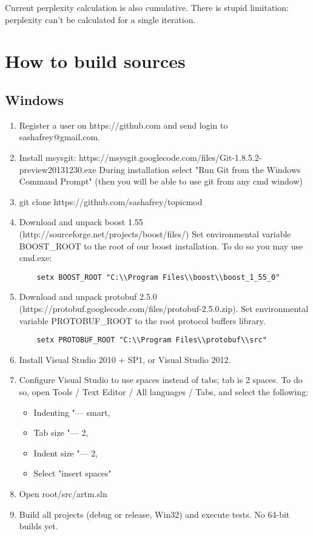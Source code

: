 \documentclass[11pt,a4paper,twoside]{report}
\begin{document}
Current perplexity calculation is also cumulative. 
There is stupid limitation: perplexity can't be calculated for a single iteration.

\section{How to build sources}

\subsection{Windows}

\begin{enumerate}
\item Register a user on https://github.com and send login to sashafrey@gmail.com.
\item Install msysgit:
	https://msysgit.googlecode.com/files/Git-1.8.5.2-preview20131230.exe
   During installation select "Run Git from the Windows Command Prompt"
   (then you will be able to use git from any cmd window)
\item git clone https://github.com/sashafrey/topicmod
\item Download and unpack boost 1.55 (http://sourceforge.net/projects/boost/files/)
   Set environmental variable BOOST\_ROOT to the root of our boost installation. To do so you may use cmd.exe:
 \begin{verbatim}
 	setx BOOST_ROOT "C:\\Program Files\\boost\\boost_1_55_0"
 \end{verbatim}
\item Download and unpack protobuf 2.5.0 (https://protobuf.googlecode.com/files/protobuf-2.5.0.zip).
   Set environmental variable PROTOBUF\_ROOT to the root protocol buffers library.
  \begin{verbatim}
	setx PROTOBUF_ROOT "C:\\Program Files\\protobuf\\src"
  \end{verbatim}
\item Install Visual Studio 2010 + SP1, or Visual Studio 2012.
\item Configure Visual Studio to use spaces instead of tabs; tab is 2 spaces.
    To do so, open Tools / Text Editor / All languages / Tabs, and select the following:
    \begin{itemize}
        \item Indenting "--- smart,
        \item Tab size "--- 2,
        \item Indent size "--- 2,
        \item Select "insert spaces"
    \end{itemize}
\item Open root/src/artm.sln
\item Build all projects (debug or release, Win32) and execute tests. No 64-bit builds yet.
\end{enumerate}
\end{document}
